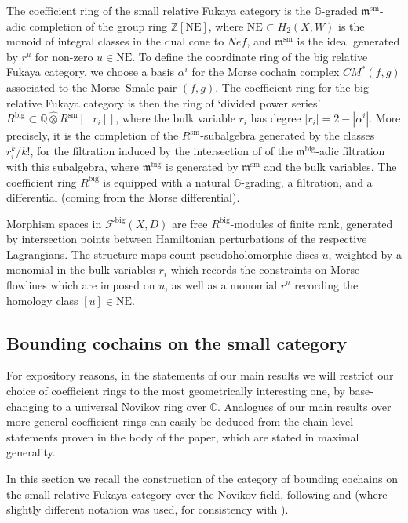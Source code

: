 \documentclass{article}
\def\G{\mathbb{G}}
\def\fuk{\EuF}
\newcommand{\fm}{\mathfrak{m}}
\def\G{\mathbb{G}}
\def\nov{r}
\def\NE{\mathrm{NE}}
\def\NE{\mathrm{NE}}
\def\Z{\mathbb{Z}}
\def\fuk{\mathcal{F}}
\def\C{\mathbb{C}}
\def\Q{\mathbb{Q}}
\def\big{{\operatorname{big}}}
\def\sm{{\operatorname{sm}}}
\def\novb{r}
\begin{document}
The coefficient ring of the small relative Fukaya category is the $\G$-graded $\fm^\sm$-adic completion of the group ring $\Z[\NE]$, where $\NE \subset H_2(X,W)$ is the monoid of integral classes in the dual cone to $Nef$, and $\fm^\sm$ is the ideal generated by $\nov^u$ for non-zero $u \in \NE$. 
To define the coordinate ring of the big relative Fukaya category, we choose a basis $\alpha^i$ for the Morse cochain complex $CM^*(f,g)$ associated to the Morse--Smale pair $(f,g)$. 
The coefficient ring for the big relative Fukaya category is then the ring of `divided power series' $R^\big \subset \Q \hat\otimes R^\sm[[\novb_i]]$, where the bulk variable $\novb_i$ has degree $|\novb_i| = 2-|\alpha^i|$. 
More precisely, it is the completion of the $R^\sm$-subalgebra generated by the classes $\nov_i^k/k!$, for the filtration induced by the intersection of of the $\fm^\big$-adic filtration with this subalgebra, where $\fm^\big$ is generated by $\fm^\sm$ and the bulk variables. 
The coefficient ring $R^\big$ is equipped with a natural $\G$-grading, a filtration, and a differential (coming from the Morse differential). 

Morphism spaces in $\fuk^\big(X,D)$ are free $R^\big$-modules of finite rank, generated by intersection points between Hamiltonian perturbations of the respective Lagrangians. 
The structure maps count pseudoholomorphic discs $u$, weighted by a monomial in the bulk variables $\nov_i$ which records the constraints on Morse flowlines which are imposed on $u$, as well as a monomial $\nov^u$ recording the homology class $[u] \in \NE$. 

\subsection{Bounding cochains on the small category}

For expository reasons, in the statements of our main results we will restrict our choice of coefficient rings to the most geometrically interesting one, by base-changing to a universal Novikov ring over $\C$. 
Analogues of our main results over more general coefficient rings can easily be deduced from the chain-level statements proven in the body of the paper, which are stated in maximal generality.

In this section we recall the construction of the category of bounding cochains on the small relative Fukaya category over the Novikov field, following \cite[Section 1.4]{perutz2022constructing} and \cite[Section 1.3]{relfukii} (where slightly different notation was used, for consistency with \cite{perutz2022constructing,GHHPS}). 
\end{document}
